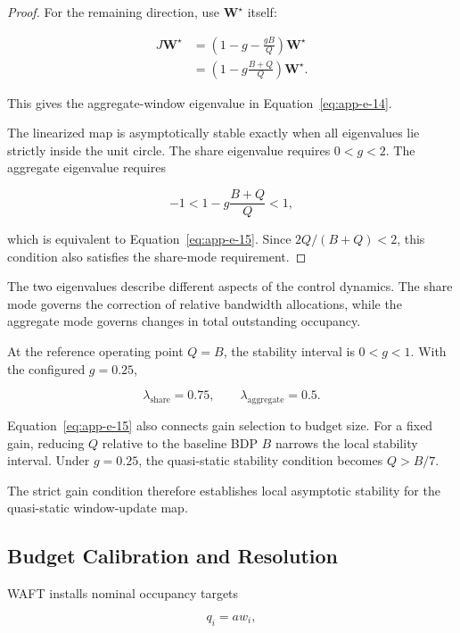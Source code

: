 \begin{proof}
For the remaining direction, use \(\mathbf W^\star\) itself:

\[
\begin{aligned}
J\mathbf W^\star
&=
\left(
1-g-\frac{gB}{Q}
\right)\mathbf W^\star\\
&=
\left(
1-g\frac{B+Q}{Q}
\right)\mathbf W^\star.
\end{aligned}
\]

This gives the aggregate-window eigenvalue in Equation~\eqref{eq:app-e-14}.

The linearized map is asymptotically stable exactly when all eigenvalues lie strictly inside the unit circle. The share eigenvalue requires \(0<g<2\). The aggregate eigenvalue requires

\[
-1<
1-g\frac{B+Q}{Q}
<1,
\]

which is equivalent to Equation~\eqref{eq:app-e-15}. Since \(2Q/(B+Q)<2\), this condition also satisfies the share-mode requirement.
\end{proof}

The two eigenvalues describe different aspects of the control dynamics. The share mode governs the correction of relative bandwidth allocations, while the aggregate mode governs changes in total outstanding occupancy.

At the reference operating point \(Q=B\), the stability interval is \(0<g<1\). With the configured \(g=0.25\),

\begin{equation}
\label{eq:app-e-21}
\lambda_{\mathrm{share}}=0.75,
\qquad
\lambda_{\mathrm{aggregate}}=0.5.
\end{equation}

Equation~\eqref{eq:app-e-15} also connects gain selection to budget size. For a fixed gain, reducing \(Q\) relative to the baseline BDP \(B\) narrows the local stability interval. Under \(g=0.25\), the quasi-static stability condition becomes \(Q>B/7\).

The strict gain condition therefore establishes local asymptotic stability for the quasi-static window-update map.

\subsection{Budget Calibration and Resolution}
\label{app:e-4}

WAFT installs nominal occupancy targets

\begin{equation}
\label{eq:app-e-22}
q_i=aw_i,
\end{equation}

